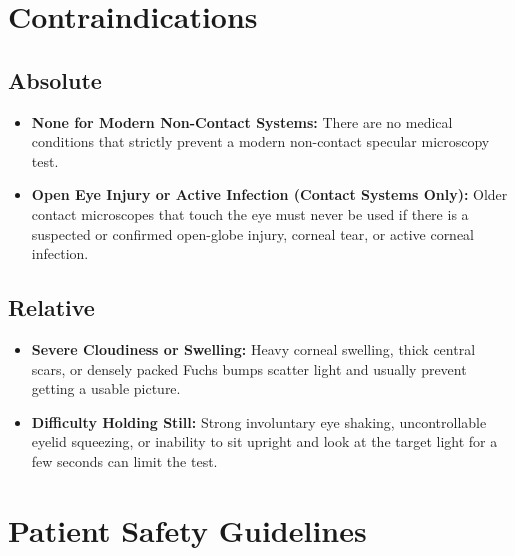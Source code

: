 \section{Contraindications}

\subsection{Absolute}

\begin{itemize}
    \item \textbf{None for Modern Non-Contact Systems:} There are no medical conditions that strictly prevent a modern non-contact specular microscopy test.
    \item \textbf{Open Eye Injury or Active Infection (Contact Systems Only):} Older contact microscopes that touch the eye must never be used if there is a suspected or confirmed open-globe injury, corneal tear, or active corneal infection.
\end{itemize}

\subsection{Relative}

\begin{itemize}
    \item \textbf{Severe Cloudiness or Swelling:} Heavy corneal swelling, thick central scars, or densely packed Fuchs bumps scatter light and usually prevent getting a usable picture.
    \item \textbf{Difficulty Holding Still:} Strong involuntary eye shaking, uncontrollable eyelid squeezing, or inability to sit upright and look at the target light for a few seconds can limit the test.
\end{itemize}

\section{Patient Safety Guidelines}

